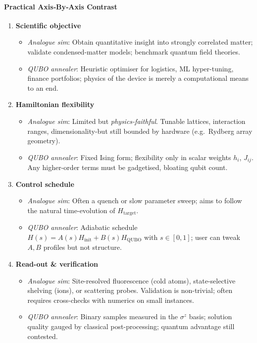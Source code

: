\documentclass[11pt,a4paper]{article}
\begin{document}
\paragraph{Practical Axis‐By‐Axis Contrast}
\begin{enumerate}
	\item \textbf{Scientific objective}  
	\begin{itemize}
		\item \emph{Analogue sim}: Obtain quantitative insight into strongly correlated matter; validate condensed-matter models; benchmark quantum field theories.  
		\item \emph{QUBO annealer}: Heuristic optimiser for logistics, ML hyper-tuning, finance portfolios; physics of the device is merely a computational means to an end.
	\end{itemize}
	
	\item \textbf{Hamiltonian flexibility}  
	\begin{itemize}
		\item \emph{Analogue sim}: Limited but \emph{physics-faithful}.  Tunable lattices, interaction ranges, dimensionality-but still bounded by hardware (e.g.\ Rydberg array geometry).  
		\item \emph{QUBO annealer}: Fixed Ising form; flexibility only in scalar weights $h_i$, $J_{ij}$.  Any higher-order terms must be gadgetised, bloating qubit count.
	\end{itemize}
	
	\item \textbf{Control schedule}  
	\begin{itemize}
		\item \emph{Analogue sim}: Often a quench or slow parameter sweep; aims to follow the natural time-evolution of $H_{\text{target}}$.  
		\item \emph{QUBO annealer}: Adiabatic schedule $H(s)=A(s)H_{\text{init}}+B(s)H_{\text{QUBO}}$ with $s\in[0,1]$; user can tweak $A,B$ profiles but not structure.
	\end{itemize}
	
	\item \textbf{Read-out \& verification}  
	\begin{itemize}
		\item \emph{Analogue sim}: Site-resolved fluorescence (cold atoms), state-selective shelving (ions), or scattering probes.  Validation is non-trivial; often requires cross-checks with numerics on small instances.  
		\item \emph{QUBO annealer}: Binary samples measured in the $\sigma^z$ basis; solution quality gauged by classical post-processing; quantum advantage still contested.
	\end{itemize}
	

\end{enumerate}
\end{document}
